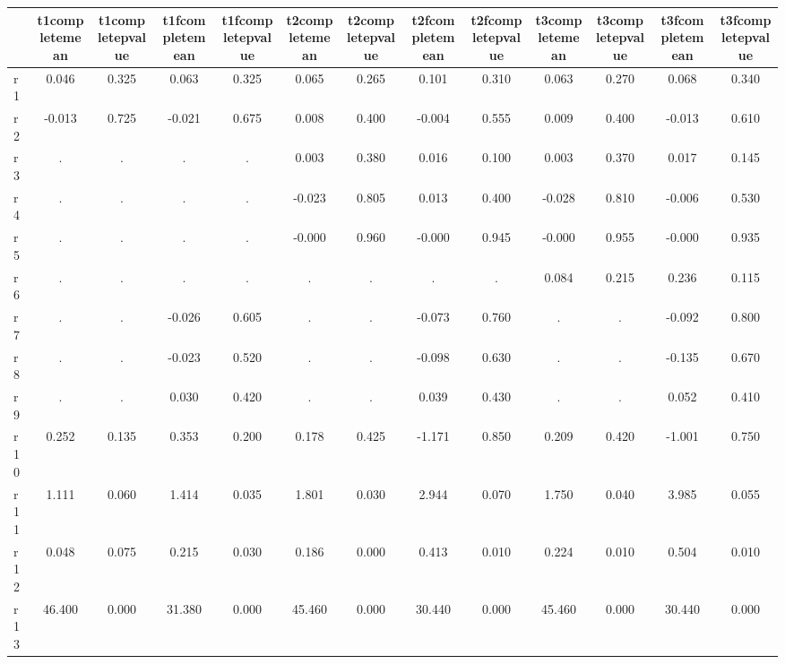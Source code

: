 \begin{table}[htbp]
\begin{tabular}{lcccccccccccc} \hline \hline
 & t1completemean  & t1completepvalue  & t1fcompletemean  & t1fcompletepvalue  & t2completemean  & t2completepvalue  & t2fcompletemean  & t2fcompletepvalue  & t3completemean  & t3completepvalue  & t3fcompletemean  & t3fcompletepvalue  \\  \hline 
r1 &     0.046 &     0.325 &     0.063 &     0.325 &     0.065 &     0.265 &     0.101 &     0.310 &     0.063 &     0.270 &     0.068 &     0.340 \\  
r2 &    -0.013 &     0.725 &    -0.021 &     0.675 &     0.008 &     0.400 &    -0.004 &     0.555 &     0.009 &     0.400 &    -0.013 &     0.610 \\  
r3 &         . &         . &         . &         . &     0.003 &     0.380 &     0.016 &     0.100 &     0.003 &     0.370 &     0.017 &     0.145 \\  
r4 &         . &         . &         . &         . &    -0.023 &     0.805 &     0.013 &     0.400 &    -0.028 &     0.810 &    -0.006 &     0.530 \\  
r5 &         . &         . &         . &         . &    -0.000 &     0.960 &    -0.000 &     0.945 &    -0.000 &     0.955 &    -0.000 &     0.935 \\  
r6 &         . &         . &         . &         . &         . &         . &         . &         . &     0.084 &     0.215 &     0.236 &     0.115 \\  
r7 &         . &         . &    -0.026 &     0.605 &         . &         . &    -0.073 &     0.760 &         . &         . &    -0.092 &     0.800 \\  
r8 &         . &         . &    -0.023 &     0.520 &         . &         . &    -0.098 &     0.630 &         . &         . &    -0.135 &     0.670 \\  
r9 &         . &         . &     0.030 &     0.420 &         . &         . &     0.039 &     0.430 &         . &         . &     0.052 &     0.410 \\  
r10 &     0.252 &     0.135 &     0.353 &     0.200 &     0.178 &     0.425 &    -1.171 &     0.850 &     0.209 &     0.420 &    -1.001 &     0.750 \\  
r11 &     1.111 &     0.060 &     1.414 &     0.035 &     1.801 &     0.030 &     2.944 &     0.070 &     1.750 &     0.040 &     3.985 &     0.055 \\  
r12 &     0.048 &     0.075 &     0.215 &     0.030 &     0.186 &     0.000 &     0.413 &     0.010 &     0.224 &     0.010 &     0.504 &     0.010 \\  
r13 &    46.400 &     0.000 &    31.380 &     0.000 &    45.460 &     0.000 &    30.440 &     0.000 &    45.460 &     0.000 &    30.440 &     0.000 \\  
\hline \hline \end{tabular}
\end{table}
